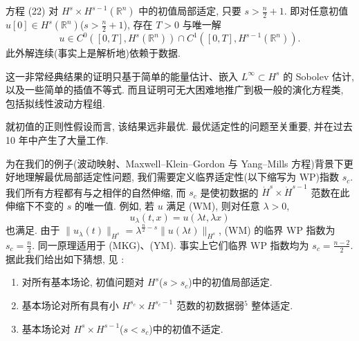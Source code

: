 \begin{theorem}\label{thm:2.2}
方程 (22) 对 $H^s \times H^{s-1}(\mathbb{R}^n)$ 中的初值局部适定, 只要 $s > \frac{n}{2} + 1$. 即对任意初值 $u[0] \in H^s(\mathbb{R}^n)$($s > \frac{n}{2} + 1$), 存在 $T > 0$ 与唯一解
\begin{equation}
u\in C^{0}([0,T],H^{s}(\mathbb{R}^{n}))\cap C^{1}([0,T],H^{s-1}(\mathbb{R}^{n})).\end{equation}
此外解连续(事实上是解析地)依赖于数据.\end{theorem}

\begin{remark}\label{rem:2.3}
这一非常经典结果的证明只基于简单的能量估计、嵌入 $L^{\infty} \subset H^{s}$ 的 Sobolev 估计, 以及一些简单的插值不等式. 而且证明可无大困难地推广到极一般的演化方程类, 包括拟线性波动方程组.\end{remark}

\begin{remark}\label{rem:2.4}
就初值的正则性假设而言, 该结果远非最优. 最优适定性的问题至关重要, 并在过去 10 年中产生了大量工作.\end{remark}

为在我们的例子(波动映射、Maxwell--Klein--Gordon 与 Yang--Mills 方程)背景下更好地理解最优局部适定性问题, 我们需要定义临界适定性(以下缩写为 WP)指数 $s_c$. 我们所有方程都有与之相伴的自然伸缩, 而 $s_c$ 是使初数据的 $\dot{H}^s \times \dot{H}^{s-1}$ 范数在此伸缩下不变的 $s$ 的唯一值. 例如, 若 $u$ 满足 (WM), 则对任意 $\lambda > 0$,
\[
u_{\lambda}(t,x)=u(\lambda t,\lambda x)
\]
也满足. 由于 $\|u_{\lambda}(t)\|_{H^{s}} = \lambda^{\frac{n}{2}-s}\|u(\lambda t)\|_{H^{s}}$, (WM) 的临界 WP 指数为 $s_{c} = \frac{n}{2}$.
同一原理适用于 (MKG)、(YM). 事实上它们临界 WP 指数均为 $s_{c} = \frac{n-2}{2}$.
据此我们给出如下猜想, 见 \cite{klai29}:
\begin{theorem*}[一般适定性猜想]
\begin{enumerate}[label=1.]
\item 对所有基本场论, 初值问题对 $H^{s}$($s > s_c$)中的初值局部适定.
\item 基本场论对所有具有小 $H^{s_c} \times H^{s_c-1}$ 范数的初数据弱$^{5}$ 整体适定.
\item 基本场论对 $H^{s} \times H^{s-1}$($s < s_c$)中的初值不适定.\end{enumerate}
\end{theorem*}

